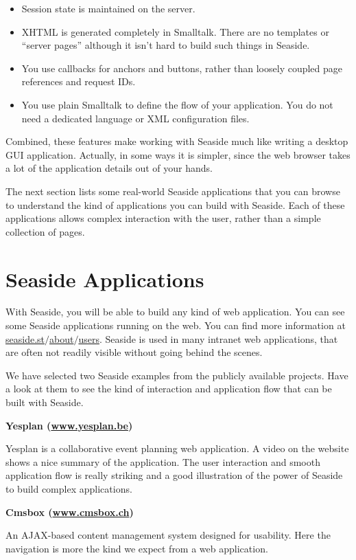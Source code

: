 \documentclass[a4paper,10pt,twoside]{book}
\begin{document}
\begin{itemize}
\item  Session state is maintained on the server.
\item  XHTML is generated completely in Smalltalk. There are no templates or ``server pages'' although it isn't hard to build such things in Seaside.
\item  You use callbacks for anchors and buttons, rather than loosely coupled page references and request IDs.
\item  You use plain Smalltalk to define the flow of your application. You do not need a dedicated language or XML configuration files.
\end{itemize}

Combined, these features make working with Seaside much like writing a desktop GUI application. Actually, in some ways it is simpler, since the web browser takes a lot of the application details out of your hands.

The next section lists some real-world Seaside applications that you can browse to understand the kind of applications you can build with Seaside. Each of these applications allows complex interaction with the user, rather than a simple collection of pages.

\section{Seaside Applications}
\label{book:introduction:seasideapplications}

With Seaside, you will be able to build any kind of web application. You can see some Seaside applications running on the web. You can find more information at \href{http://seaside.st/about/users}{seaside.st$/$about$/$users}. Seaside is used in many intranet web applications, that are often not readily visible without going behind the scenes.

We have selected two Seaside examples from the publicly available projects. Have a look at them to see the kind of interaction and application flow that can be built with Seaside.

\begin{list}{}{}
\item\hspace{-\labelwidth}\textbf{ \textbf{Yesplan} (\href{http://www.yesplan.be/}{www.yesplan.be}) }
\item  Yesplan is a collaborative event planning web application. A video on the website shows a nice summary of the application. The user interaction and smooth application flow is really striking and a good illustration of the power of Seaside to build complex applications.
\item\hspace{-\labelwidth}\textbf{ \textbf{Cmsbox} (\href{http://www.cmsbox.ch/}{www.cmsbox.ch}) }
\item  An AJAX-based content management system designed for usability. Here the navigation is more the kind we expect from a web application.
\end{list}
\end{document}

